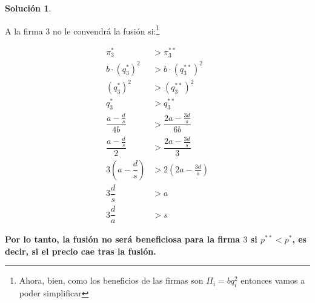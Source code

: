 \documentclass[a4paper, 11pt]{article}
\theoremstyle{definition}
\newtheorem{solucion}{Soluci\'on}
\newcommand{\p}[1]{\left(#1\right)}
\begin{document}
\begin{solucion}
\begin{enumerate}
\begin{enumerate}
A la firma 3 no le convendrá la fusión si:\footnote{Ahora, bien, como los beneficios de las firmas son $\Pi_i=bq_i^2$ entonces vamos a poder simplificar}

\vspace*{-16pt}

\begin{align*}
\pi_3^*&>\pi_3^{**}\\
b\cdot(q_3^*)^2&>b\cdot (q_3^{**})^2\\
(q_3^*)^2&>(q_3^{**})^2\\
q_3^*&>q_3^{**}\\
\dfrac{a-\frac{d}{s}}{4b}&>\dfrac{2a-\frac{3d}{s}}{6b}\\
\dfrac{a-\frac{d}{s}}{2}&>\dfrac{2a-\frac{3d}{s}}{3}\\
3\p{a-\dfrac{d}{s}}&>2\p{2a-\frac{3d}{s}}\\
3\dfrac{d}{s}&>a\\
3\dfrac{d}{a}&>s
\end{align*}

\textbf{Por lo tanto, la fusión no será beneficiosa para la firma $3$ si $p^{**}<p^*$, es decir, si el precio cae tras la fusión.}








\end{enumerate}
\end{enumerate}
\end{solucion}
\end{document}
